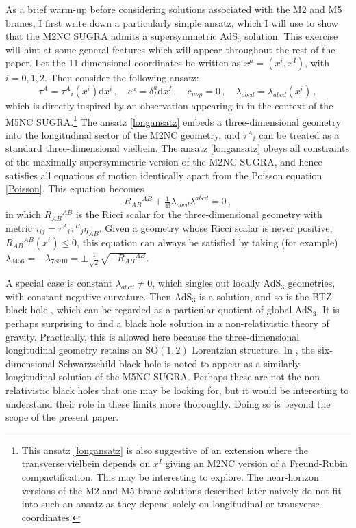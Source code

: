 \documentclass[11pt]{article}
\newcommand{\be}{\begin{equation}}
\newcommand{\ee}{\end{equation}}
\newcommand{\dd}{\mathrm{d}}
\newcommand{\Rl}{{R}}
\numberwithin{equation}{section}
\begin{document}
{{As a brief warm-up before considering solutions associated with the M2 and M5 branes, I first write down a particularly simple ansatz, which I will use to show that the M2NC SUGRA admits a supersymmetric AdS${}_3$ solution.
This exercise will hint at some general features which will appear throughout the rest of the paper.
Let the 11-dimensional coordinates be written as $x^\mu = (x^i, x^I)$, with $i=0,1,2$. Then consider the following ansatz:
\be
\tau^A = \tau^A{}_i(x^i) \dd x^i \,,\quad e^a = \delta^a_I \dd x^I \,, \quad
c_{\mu\nu\rho} = 0 \,,\quad \lambda_{abcd} = \lambda_{abcd} ( x^i) \,,
\label{longansatz}
\ee
which is directly inspired by an observation appearing in \cite{Bergshoeff:2025grj} in the context of the M5NC SUGRA.\footnote{This ansatz \eqref{longansatz} is also suggestive of an extension where the transverse vielbein depends on $x^I$ giving an M2NC version of a Freund-Rubin compactification\cite{Freund:1980xh}. This may be interesting to explore. The near-horizon versions of the M2 and M5 brane solutions described later naively do not fit into such an ansatz as they depend solely on longitudinal or transverse coordinates.}
The ansatz \eqref{longansatz} embeds a three-dimensional geometry into the longitudinal sector of the M2NC geometry, and $\tau^A{}_i$ can be treated as a standard three-dimensional vielbein.
The ansatz \eqref{longansatz} obeys all constraints of the maximally supersymmetric version of the M2NC SUGRA, and hence satisfies all equations of motion identically apart from the Poisson equation \eqref{Poisson}.
This equation becomes
\be
 \Rl_{AB}{}^{AB} + \tfrac{1}{4!} \lambda_{abcd} \lambda^{abcd} = 0 \,,
\label{3P}
\ee
in which $\Rl_{AB}{}^{AB}$ is the Ricci scalar for the three-dimensional geometry with metric $\tau_{ij} = \tau^A{}_i \tau^B{}_j \eta_{AB}$.
Given a geometry whose Ricci scalar is never positive, $R_{AB}{}^{AB}(x^i) \leq 0$, this equation can always be satisfied by taking (for example) $\lambda_{3456} = - \lambda_{78910} = \pm \tfrac{1}{\sqrt{2}} \sqrt{-\Rl_{AB}{}^{AB}}$. 

A special case is constant $\lambda_{abcd} \neq 0$, which singles out locally AdS${}_3$ geometries, with constant negative curvature. 
Then AdS${}_3$ is a solution, and so is the BTZ black hole \cite{Banados:1992wn}, which can be regarded as a particular quotient of global AdS${}_3$.
It is perhaps surprising to find a black hole solution in a non-relativistic theory of gravity.
Practically, this is allowed here because the three-dimensional longitudinal geometry retains an $\mathrm{SO}(1,2)$ Lorentzian structure.
In \cite{Bergshoeff:2025grj}, the six-dimensional Schwarzschild black hole is noted to appear as a similarly longitudinal solution of the M5NC SUGRA.
Perhaps these are not the non-relativistic black holes that one may be looking for, but it would be interesting to understand their role in these limits more thoroughly. Doing so is beyond the scope of the present paper.

}}
\end{document}
